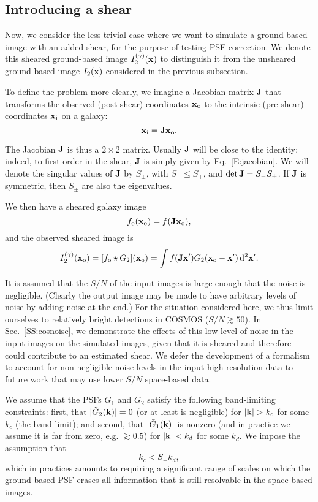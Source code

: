 \documentclass[twocolumn,useAMS,usenatbib]{mn2e}
\newcommand{\beq}{\begin{equation}}
\newcommand{\eeq}{\end{equation}}
\newcommand{\rmd}{\mathrm{d}}
\newcommand{\newtext}{}
\begin{document}
\subsection{Introducing a shear}\label{SS:shear}

Now, we consider the less trivial case where we want to simulate a ground-based
image with an added shear, for the purpose of testing PSF correction.
We denote this sheared ground-based image $I_2^{(\gamma)}({\bf x})$ to
distinguish it from the unsheared ground-based image $I_2({\bf x})$
considered in the previous subsection.

To define the problem more clearly, we imagine a Jacobian matrix ${\bf
  J}$ that transforms the observed (post-shear) coordinates ${\bf
  x}_{\rm o}$ to the intrinsic (pre-shear) coordinates ${\bf x}_{\rm
  i}$ on a galaxy:
\beq
{\bf x}_{\rm i} = {\bf Jx}_{\rm o}.
\eeq

The Jacobian ${\bf J}$ is thus a $2\times2$ matrix.  Usually ${\bf J}$
will be close to the identity; indeed, to first order in the shear,
${\bf J}$ is simply given by Eq.~\eqref{E:jacobian}.  We will denote the singular values of ${\bf J}$ by $S_\pm$, with
$S_-\le S_+$, and $\det{\bf J}=S_-S_+$.  If ${\bf J}$ is
symmetric, then $S_\pm$ are also the eigenvalues.

We then have a sheared galaxy image
\beq
f_{\rm o}({\bf x}_{\rm o}) = f({\bf Jx}_{\rm o}),
\eeq
and the observed sheared image is
\beq
I_2^{(\gamma)}({\bf x}_{\rm o}) = [f_{\rm o}\star G_2]({\bf x}_{\rm o}) = \int f({\bf Jx}') G_2({\bf x}_{\rm o}-{\bf x}')\,\rmd^2{\bf x}'.
\eeq

It is assumed that the $S/N$ of the input images is large enough that
the  noise is negligible.  (Clearly the output image may be made
to have arbitrary levels of noise by adding noise at the end.)  For
the situation considered here, we thus limit ourselves to relatively
bright detections in COSMOS ($S/N \gtrsim 50$).  \newtext{In
Sec.~\ref{SS:cosnoise}, we demonstrate the effects of this low
level of noise in the input images 
on the simulated images, given that it is sheared and
therefore could contribute to an estimated shear.}  We defer the development of a
formalism to account for non-negligible noise levels in the input
high-resolution data to future work
that may use lower $S/N$ space-based data.

We assume that the PSFs $G_1$ and $G_2$ satisfy the following band-limiting constraints: first, that
$|\tilde G_2({\bf k})|=0$ (or at least is negligible) for $|{\bf
  k}|>k_c$ for some $k_c$ (the band limit); and second,
that $|\tilde G_1({\bf k})|$ is nonzero (and in practice we assume it
is far from zero, e.g. $\gtrsim 0.5$) for $|{\bf k}|<k_d$ for
some $k_d$.  We impose the assumption that
\beq
k_c < S_-k_d,
\eeq
which in practices amounts to requiring a significant range of scales
on which the ground-based PSF erases all information that is still
resolvable in the space-based images.
\end{document}
